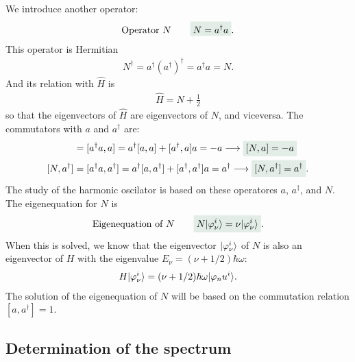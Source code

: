 We introduce another operator:
\begin{align}
    \text{Operator $N$}\qquad\highlight{N=a^\dagger a}.
\end{align}
This operator is Hermitian 
\begin{align}
    N^\dagger=a^\dagger(a^\dagger)^\dagger=a^\dagger a=N.
\end{align}
And its relation with $\hat{H}$ is 
\begin{align}
    \hat{H}=N+\frac{1}{2}
\end{align}
so that the eigenvectors of $\hat{H}$ are eigenvectors of $N$, and viceversa. The commutators with $a$ and $a^\dagger$ are:
\begin{align}
    [N,a]&=[a^\dagger a,a]=a^\dagger[a,a]+[a^\dagger,a]a=-a\longrightarrow\highlight{[N,a]=-a}\\
    [N,a^\dagger]&=[a^\dagger a,a^\dagger]=a^\dagger[a,a^\dagger]+[a^\dagger,a^\dagger]a=a^\dagger\longrightarrow\highlight{[N,a^\dagger]=a^\dagger}.
\end{align}
The study of the harmonic oscilator is based on these operatores $a$, $a^\dagger$, and $N$. The eigenequation for $N$ is 
\begin{align}
    \text{Eigenequation of $N$}\qquad\highlight{N\ket{\varphi_\nu^i}=\nu\ket{\varphi_\nu^i}}.
\end{align}
When this is solved, we know that the eigenvector $|\varphi_\nu^i\rangle$ of $N$ is also an eigenvector of $H$ with the eigenvalue $E_\nu=(\nu+1/2)\hbar\omega$:
\begin{align}
    H|\varphi_\nu^i\rangle=(\nu+1/2)\hbar\omega|\varphi_nu^i\rangle.
\end{align}
The solution of the eigenequation of $N$ will be based on the commutation relation $[a,a^\dagger]=1$.

%
\subsection{Determination of the spectrum}
